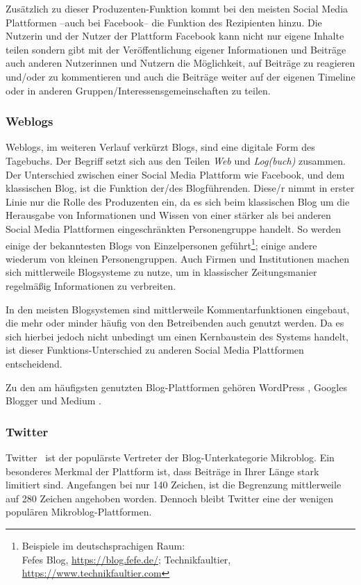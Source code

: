Zusätzlich zu dieser Produzenten-Funktion kommt bei den meisten Social Media Plattformen --auch bei Facebook-- die Funktion des Rezipienten hinzu. Die Nutzerin und der Nutzer der Plattform Facebook kann nicht nur eigene Inhalte teilen sondern gibt mit der Veröffentlichung eigener Informationen und Beiträge auch anderen Nutzerinnen und Nutzern die Möglichkeit, auf Beiträge zu reagieren und/oder zu kommentieren und auch die Beiträge weiter auf der eigenen Timeline oder in anderen Gruppen/Interessensgemeinschaften zu teilen.

\subsubsection{Weblogs}

Weblogs, im weiteren Verlauf verkürzt Blogs, sind eine digitale Form des Tagebuchs. Der Begriff setzt sich aus den Teilen \textit{Web} und \textit{Log(buch)} zusammen. Der Unterschied zwischen einer Social Media Plattform wie Facebook, und dem klassischen Blog, ist die Funktion der/des Blogführenden. Diese/r nimmt in erster Linie nur die Rolle des Produzenten ein, da es sich beim klassischen Blog um die Herausgabe von Informationen und Wissen von einer stärker als bei anderen Social Media Plattformen eingeschränkten Personengruppe handelt. So werden einige der bekanntesten Blogs von Einzelpersonen geführt\footnote{Beispiele im deutschsprachigen Raum:\\Fefes Blog, \url{https://blog.fefe.de/}; Technikfaultier, \url{https://www.technikfaultier.com}}; einige andere wiederum von kleinen Personengruppen. Auch Firmen und Institutionen machen sich mittlerweile Blogsysteme zu nutze, um in klassischer Zeitungsmanier regelmäßig Informationen zu verbreiten.

In den meisten Blogsystemen sind mittlerweile Kommentarfunktionen eingebaut, die mehr oder minder häufig von den Betreibenden auch genutzt werden. Da es sich hierbei jedoch nicht unbedingt um einen Kernbaustein des Systems handelt, ist dieser Funktions-Unterschied zu anderen Social Media Plattformen entscheidend.

Zu den am häufigsten genutzten Blog-Plattformen gehören WordPress \faWordpress, Googles Blogger und Medium \faMedium.

\subsubsection{Twitter}

Twitter \faTwitter\ ist der populärste Vertreter der Blog-Unterkategorie Mikroblog. Ein besonderes Merkmal der Plattform ist, dass Beiträge in Ihrer Länge stark limitiert sind. Angefangen bei nur 140 Zeichen, ist die Begrenzung mittlerweile auf 280 Zeichen angehoben worden. Dennoch bleibt Twitter eine der wenigen populären Mikroblog-Plattformen.

